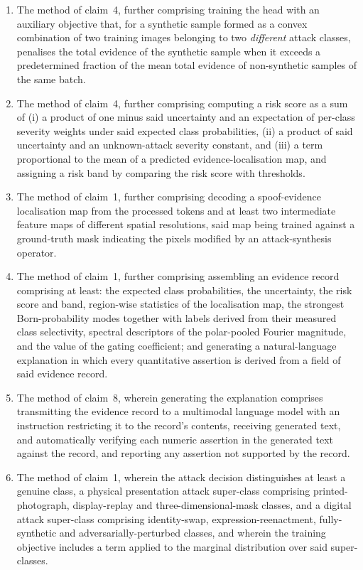 \documentclass[conference]{IEEEtran}
\begin{document}
\begin{enumerate}
\item[\textbf{5.}] The method of claim~4, further comprising training the head with
an auxiliary objective that, for a synthetic sample formed as a convex combination
of two training images belonging to two \emph{different} attack classes, penalises
the total evidence of the synthetic sample when it exceeds a predetermined fraction
of the mean total evidence of non-synthetic samples of the same batch.

\item[\textbf{6.}] The method of claim~4, further comprising computing a risk score
as a sum of (i) a product of one minus said uncertainty and an expectation of
per-class severity weights under said expected class probabilities, (ii) a product
of said uncertainty and an unknown-attack severity constant, and (iii) a term
proportional to the mean of a predicted evidence-localisation map, and assigning a
risk band by comparing the risk score with thresholds.

\item[\textbf{7.}] The method of claim~1, further comprising decoding a
spoof-evidence localisation map from the processed tokens and at least two
intermediate feature maps of different spatial resolutions, said map being trained
against a ground-truth mask indicating the pixels modified by an attack-synthesis
operator.

\item[\textbf{8.}] The method of claim~1, further comprising assembling an evidence
record comprising at least: the expected class probabilities, the uncertainty, the
risk score and band, region-wise statistics of the localisation map, the strongest
Born-probability modes together with labels derived from their measured class
selectivity, spectral descriptors of the polar-pooled Fourier magnitude, and the
value of the gating coefficient; and generating a natural-language explanation in
which every quantitative assertion is derived from a field of said evidence record.

\item[\textbf{9.}] The method of claim~8, wherein generating the explanation
comprises transmitting the evidence record to a multimodal language model with an
instruction restricting it to the record's contents, receiving generated text, and
automatically verifying each numeric assertion in the generated text against the
record, and reporting any assertion not supported by the record.

\item[\textbf{10.}] The method of claim~1, wherein the attack decision distinguishes
at least a genuine class, a physical presentation attack super-class comprising
printed-photograph, display-replay and three-dimensional-mask classes, and a
digital attack super-class comprising identity-swap, expression-reenactment,
fully-synthetic and adversarially-perturbed classes, and wherein the training
objective includes a term applied to the marginal distribution over said
super-classes.


\end{enumerate}
\end{document}
